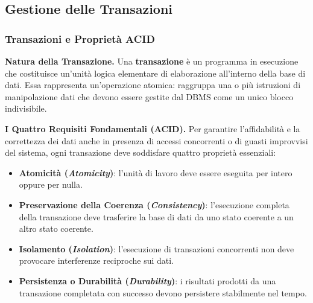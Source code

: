 \documentclass[12pt]{extarticle}
\begin{document}
\subsection{Gestione delle Transazioni}

\subsubsection{Transazioni e Proprietà ACID}
\noindent \textbf{Natura della Transazione.} Una \textbf{transazione} è un programma in esecuzione che costituisce un'unità logica elementare di elaborazione all'interno della base di dati. Essa rappresenta un'operazione atomica: raggruppa una o più istruzioni di manipolazione dati che devono essere gestite dal DBMS come un unico blocco indivisibile.

\medskip
\noindent \textbf{I Quattro Requisiti Fondamentali (ACID).} Per garantire l'affidabilità e la correttezza dei dati anche in presenza di accessi concorrenti o di guasti improvvisi del sistema, ogni transazione deve soddisfare quattro proprietà essenziali:
\begin{itemize}
    \item \textbf{Atomicità (\textit{Atomicity})}: l'unità di lavoro deve essere eseguita per intero oppure per nulla.
    \item \textbf{Preservazione della Coerenza (\textit{Consistency})}: l'esecuzione completa della transazione deve trasferire la base di dati da uno stato coerente a un altro stato coerente.
    \item \textbf{Isolamento (\textit{Isolation})}: l'esecuzione di transazioni concorrenti non deve provocare interferenze reciproche sui dati.
    \item \textbf{Persistenza o Durabilità (\textit{Durability})}: i risultati prodotti da una transazione completata con successo devono persistere stabilmente nel tempo.
\end{itemize}
\end{document}
